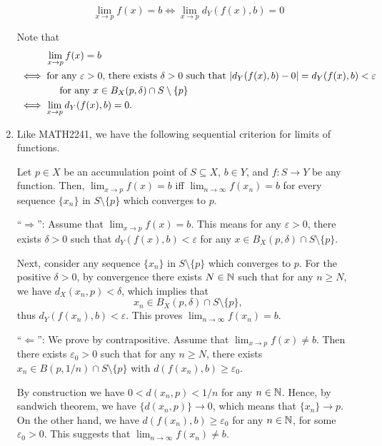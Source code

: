 \begin{enumerate}
\[
\lim_{x\to p}f(x)=b\iff \lim_{x\to p}d_Y(f(x),b)=0
\]
\begin{pf}
Note that
\begin{align*}
&\hspace{1cm}\lim_{x\to p}f(x)=b\\
&\iff \text{for any \(\varepsilon>0\), there exists \(\delta>0\) such that \(|d_Y(f(x),b)-0|=d_Y(f(x),b)<\varepsilon
\)}\\
&\hspace{1.5cm}\text{for any \(x\in B_X(p,\delta)\cap S\setminus\{p\}\)}\\
&\iff \lim_{x\to p}d_Y(f(x),b)=0.
\end{align*}
\end{pf}

\item Like MATH2241, we have the following sequential criterion for limits of
functions.
\begin{proposition}
\label{prp:lim-seq-crit}
Let \(p\in X\) be an accumulation point of \(S\subseteq X\), \(b\in Y\), and
\(f:S\to Y\) be any function. Then, \(\displaystyle \lim_{x\to p}f(x)=b\) iff
\(\displaystyle \lim_{n\to \infty}f(x_n)=b\) for every sequence \(\{x_n\}\) in
\(S\setminus\{p\}\) which converges to \(p\).
\end{proposition}
\begin{pf}
``\(\Rightarrow\)'': Assume that \(\displaystyle \lim_{x\to p}f(x)=b\). This
means for any \(\varepsilon>0\), there exists \(\delta>0\) such that
\(d_Y(f(x),b)<\varepsilon\) for any \(x\in B_X(p,\delta)\cap S\setminus\{p\}\).

Next, consider any sequence \(\{x_n\}\) in \(S\setminus \{p\}\) which converges
to \(p\). For the positive \(\delta>0\), by convergence there exists \(N\in\mathbb{N}\)
such that for any \(n\ge N\), we have \(d_X(x_n,p)<\delta\), which implies that
\[
x_n\in B_X(p,\delta)\cap S\setminus \{p\},
\]
thus \(d_Y(f(x_n),b)<\varepsilon\). This proves \(\lim_{n\to \infty}f(x_n)=b\).

``\(\Leftarrow\)'': We prove by contrapositive. Assume that \(\lim_{x\to
p}f(x)\ne b\). Then there exists \(\varepsilon_0>0\) such that for any \(n\ge
N\), there exists \(x_n\in B(p,1/n)\cap S\setminus \{p\}\) with
\(d(f(x_n),b)\ge \varepsilon_0\).

By construction we have \(0<d(x_n,p)<1/n\) for any \(n\in\mathbb{N}\). Hence, by
sandwich theorem, we have \(\{d(x_n,p)\}\to 0\), which means that \(\{x_n\}\to
p\).  On the other hand, we have \(d(f(x_n),b)\ge \varepsilon_0\) for any
\(n\in\mathbb{N}\), for some \(\varepsilon_0>0\). This suggests that \(\lim_{n\to
\infty}f(x_n)\ne b\).
\end{pf}


\end{enumerate}
